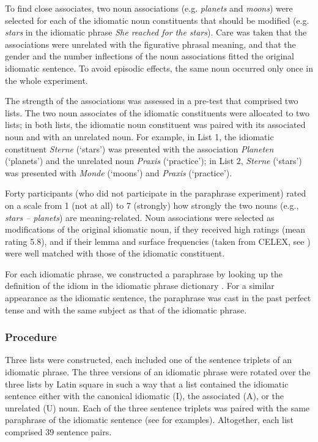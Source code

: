 \documentclass[output=paper]{langsci/langscibook}
\begin{document}
To find close associates, two noun associations (e.g. \textit{planets} and \textit{moons}) were selected for each of the idiomatic noun constituents that should be modified (e.g. \textit{stars} in the idiomatic phrase \textit{She reached for the stars}). Care was taken that the associations were unrelated with the figurative phrasal meaning, and that the gender and the number inflections of the noun associations fitted the original idiomatic sentence. To avoid episodic effects, the same noun occurred only once in the whole experiment.

The strength of the associations was assessed in a pre-test that comprised two lists. The two noun associates of the idiomatic constituents were allocated to two lists; in both lists, the idiomatic noun constituent was paired with its associated noun and with an unrelated noun.  For example, in List 1, the idiomatic constituent \textit{Sterne} (‘stars’) was presented with the association \textit{Planeten} (‘planets’) and the unrelated noun \textit{Praxis} (‘practice’); in List 2, \textit{Sterne} (‘stars’) was presented with \textit{Monde} (‘moons’) and \textit{Praxis} (‘practice’).

Forty participants (who did not participate in the paraphrase experiment) rated on a scale from 1 (not at all) to 7 (strongly) how strongly the two nouns (e.g., \textit{stars – planets}) are meaning-related. Noun associations were selected as modifications of the original idiomatic noun, if they received high ratings (mean rating 5.8), and if their lemma and surface frequencies (taken from CELEX, see \citealt{baayen:1993}) were well matched with those of the idiomatic constituent. 

For each idiomatic phrase, we constructed a paraphrase by looking up the definition of the idiom in the idiomatic phrase dictionary \citep{redewendungen:2002}. For a similar appearance as the idiomatic sentence, the paraphrase was cast in the past perfect tense and with the same subject as that of the idiomatic phrase. 

\subsubsection{Procedure}
Three lists were constructed, each included one of the sentence triplets of an idiomatic phrase.  The three versions of an idiomatic phrase were rotated over the three lists by Latin square in such a way that a list contained the idiomatic sentence either with the canonical idiomatic (I), the associated (A), or the unrelated (U) noun. Each of the three sentence triplets was paired with the same paraphrase of the idiomatic sentence (see  for examples). Altogether, each list comprised 39 sentence pairs. 
\end{document}
